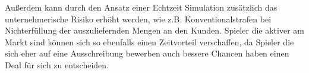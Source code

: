 \par Außerdem kann durch den Ansatz einer Echtzeit Simulation zusätzlich das unternehmerische Risiko erhöht werden, wie z.B. Konventionalstrafen bei Nichterfüllung der auszuliefernden Mengen an den Kunden. Spieler die aktiver am Markt sind können sich so ebenfalls einen Zeitvorteil verschaffen, da Spieler die sich eher auf eine Ausschreibung bewerben auch bessere Chancen haben einen Deal für sich zu entscheiden.
